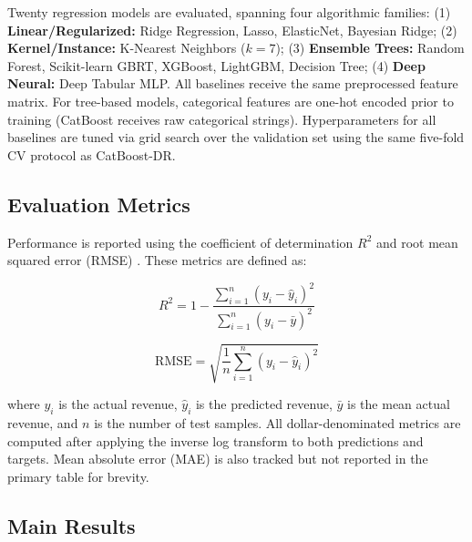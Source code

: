 \documentclass[journal]{IEEEtran}
\begin{document}
Twenty regression models are evaluated, spanning four algorithmic families: (1) \textbf{Linear/Regularized:} Ridge Regression, Lasso, ElasticNet, Bayesian Ridge; (2) \textbf{Kernel/Instance:} K-Nearest Neighbors (\(k=7\)); (3) \textbf{Ensemble Trees:} Random Forest, Scikit-learn GBRT, XGBoost, LightGBM, Decision Tree; (4) \textbf{Deep Neural:} Deep Tabular MLP. All baselines receive the same preprocessed feature matrix. For tree-based models, categorical features are one-hot encoded prior to training (CatBoost receives raw categorical strings). Hyperparameters for all baselines are tuned via grid search over the validation set using the same five-fold CV protocol as CatBoost-DR.

\subsection{Evaluation Metrics}

Performance is reported using the coefficient of determination \(R^2\) and root mean squared error (RMSE) \cite{willmott2025metrics}. These metrics are defined as:

\begin{equation}
R^2 = 1 - \frac{\sum_{i=1}^{n}(y_i - \hat{y}_i)^2}{\sum_{i=1}^{n}(y_i - \bar{y})^2}
\end{equation}

\begin{equation}
\text{RMSE} = \sqrt{\frac{1}{n}\sum_{i=1}^{n}(y_i - \hat{y}_i)^2}
\end{equation}

where $y_i$ is the actual revenue, $\hat{y}_i$ is the predicted revenue, $\bar{y}$ is the mean actual revenue, and $n$ is the number of test samples. All dollar-denominated metrics are computed after applying the inverse log transform to both predictions and targets. Mean absolute error (MAE) is also tracked but not reported in the primary table for brevity.

\subsection{Main Results}
\end{document}
